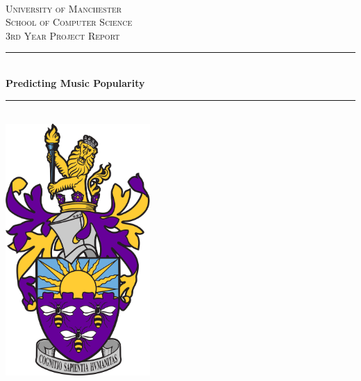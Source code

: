 \begin{titlepage}

\newcommand{\HRule}{\rule{\linewidth}{0.5mm}} %

 

\center %

\quad\\
\textsc{\huge University of Manchester}\\[0.2cm] %
\textsc{\Large School of Computer Science}\\[0.5cm] %
\textsc{\large 3rd Year Project Report}\\[0.5cm]

\makeatletter
\HRule \\[0.5cm]
{ \huge \bfseries Predicting Music Popularity}\\[0.4cm] %
\HRule \\[1.5cm]
\includegraphics[width=5.5cm]{title/logo.png}\\[1cm] %


\end{titlepage}
